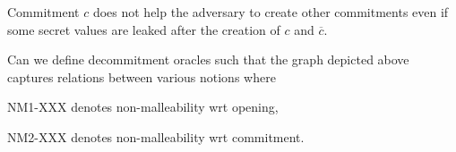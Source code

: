 \documentclass[landscape,footrule]{foils}
\newcommand{\lastline}{\vspace*{-2ex}}
\begin{document}
Commitment $c$ does not help the adversary to create other commitments
even if some secret values are leaked after the creation of $c$ and $\overline{c}$.
\lastline



Can we define decommitment oracles such that the graph depicted
above captures relations between various notions where
\begin{triangles}
  \item NM1-XXX denotes non-malleability wrt opening,
  \item NM2-XXX denotes non-malleability wrt commitment.
\end{triangles}
\end{document}
